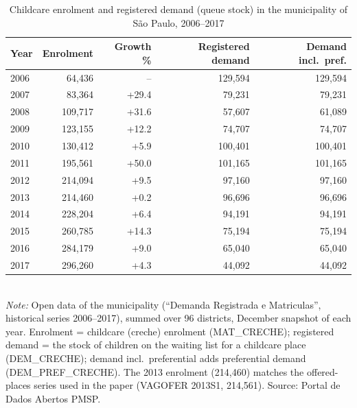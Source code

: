 \begin{table}[htbp]\centering
\caption{Childcare enrolment and registered demand (queue stock) in the municipality of S\~ao Paulo, 2006--2017}
\label{tab:T11}
\small
\begin{tabular}{lrrrr}
\toprule
Year & Enrolment & Growth \% & Registered demand & Demand incl.\ pref. \\
\midrule
2006 & 64,436 & -- & 129,594 & 129,594 \\
2007 & 83,364 & +29.4 & 79,231 & 79,231 \\
2008 & 109,717 & +31.6 & 57,607 & 61,089 \\
2009 & 123,155 & +12.2 & 74,707 & 74,707 \\
2010 & 130,412 & +5.9 & 100,401 & 100,401 \\
2011 & 195,561 & +50.0 & 101,165 & 101,165 \\
2012 & 214,094 & +9.5 & 97,160 & 97,160 \\
2013 & 214,460 & +0.2 & 96,696 & 96,696 \\
2014 & 228,204 & +6.4 & 94,191 & 94,191 \\
2015 & 260,785 & +14.3 & 75,194 & 75,194 \\
2016 & 284,179 & +9.0 & 65,040 & 65,040 \\
2017 & 296,260 & +4.3 & 44,092 & 44,092 \\
\bottomrule
\end{tabular}
\\[3pt]{\footnotesize \textit{Note:} Open data of the municipality (``Demanda Registrada e Matriculas'', historical series 2006--2017), summed over 96 districts, December snapshot of each year. Enrolment = childcare (creche) enrolment (MAT\_CRECHE); registered demand = the stock of children on the waiting list for a childcare place (DEM\_CRECHE); demand incl.\ preferential adds preferential demand (DEM\_PREF\_CRECHE). The 2013 enrolment (214,460) matches the offered-places series used in the paper (VAGOFER 2013S1, 214,561). Source: Portal de Dados Abertos PMSP.}
\end{table}
